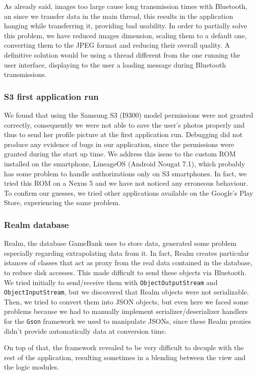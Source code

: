 As already said, images too large cause long transmission times with Bluetooth, 
an since we transfer data  in the main thread, this results in the application 
hanging while transferring it, providing bad usability. In order to partially 
solve this problem, we have reduced images dimension, scaling them to a default 
one, converting them to the JPEG format and reducing their overall quality. A 
definitive solution would be using a thread different from the one running the 
user interface, displaying to the user a loading message during Bluetooth 
transmissions.

\subsubsection{S3 first application run}

We found that using the Samsung S3 (I9300) model permissions were not granted 
correctly, consequently we were not able to save the user's photos properly and 
thus to send her profile picture at the first application run. Debugging did 
not produce any evidence of bugs in our application, since the permissions 
were granted during the start up time.
We address this issue to the custom ROM installed on the smartphone, LineageOS 
(Android Nougat 7.1), which probably has some problem to handle authorizations 
only on S3 smartphones. In fact, we tried this ROM on a Nexus 5 and we have not 
noticed any erroneous behaviour. To confirm our guesses, we tried other 
applications available on the Google's Play Store, experiencing the same 
problem.

\subsubsection{Realm database}

Realm, the database GameBank uses to store data, generated some problem 
especially regarding extrapolating data from it. In fact, Realm creates 
particular istances of classes that act as proxy from the real data contained 
in the database, to reduce disk accesses. This made difficult to send these  
objects via Bluetooth. We tried initially to send/receive them with 
\texttt{ObjectOutputStream} and \texttt{ObjectInputStream}, but we discovered 
that Realm objects were not serializable. Then, we tried to convert them into 
JSON objects, but even here we faced some problems because we had to manually 
implement serializer/deserializer handlers for the \texttt{Gson} framework we 
used to manipulate JSONs, since these Realm proxies didn't provide 
automatically data at conversion time.

On top of that, the framework revealed to be very difficult to decuple with the 
rest of the application, resulting sometimes in a blending between the view and 
the logic modules.
